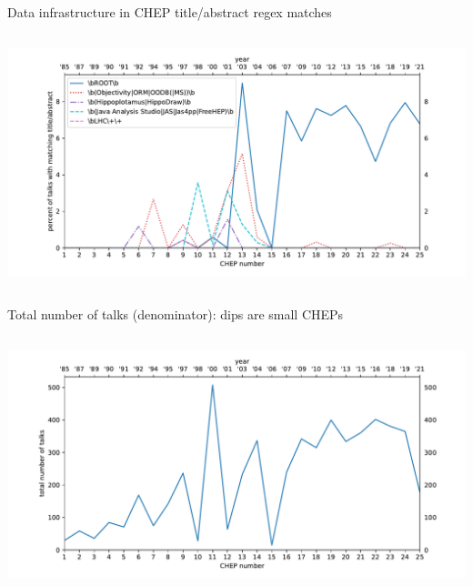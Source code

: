 \documentclass[aspectratio=169]{beamer}
\begin{document}
\begin{frame}{Data infrastructure in CHEP title/abstract regex matches}
\vspace{0.15 cm}
\begin{columns}
\includegraphics[width=\linewidth]{PLOTS/chep-papers-package-1.pdf}
\end{columns}
\end{frame}

\begin{frame}{Total number of talks (denominator): dips are small CHEPs}
\vspace{0.15 cm}
\begin{columns}
\includegraphics[width=\linewidth]{PLOTS/chep-papers-denominator.pdf}
\end{columns}
\end{frame}
\end{document}
